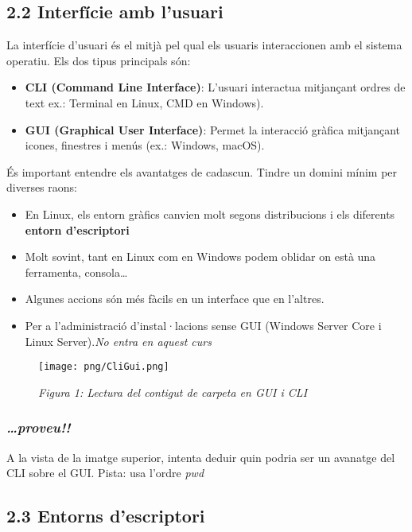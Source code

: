 \documentclass[
  a4paper,
]{article}
\providecommand{\tightlist}{%
  \setlength{\itemsep}{0pt}\setlength{\parskip}{0pt}}
\begin{document}
\subsection{2.2 Interfície amb
l'usuari}\label{interfuxedcie-amb-lusuari}

La interfície d'usuari és el mitjà pel qual els usuaris interaccionen
amb el sistema operatiu. Els dos tipus principals són:

\begin{itemize}
\item
  \textbf{CLI (Command Line Interface)}: L'usuari interactua mitjançant
  ordres de text ex.: Terminal en Linux, CMD en Windows).
\item
  \textbf{GUI (Graphical User Interface)}: Permet la interacció gràfica
  mitjançant icones, finestres i menús (ex.: Windows, macOS).
\end{itemize}

És important entendre els avantatges de cadascun. Tindre un domini mínim
per diverses raons:

\begin{itemize}
\tightlist
\item
  En Linux, els entorn gràfics canvien molt segons distribucions i els
  diferents \textbf{entorn d'escriptori}
\item
  Molt sovint, tant en Linux com en Windows podem oblidar on està una
  ferramenta, consola\ldots{}
\item
  Algunes accions són més fàcils en un interface que en l'altres.
\item
  Per a l'administració d'instal·lacions sense GUI (Windows Server Core
  i Linux Server).\emph{No entra en aquest curs}
\end{itemize}

\begin{figure}
\centering
\texttt{[image: png/CliGui.png]}
\caption{\emph{Figura 1: Lectura del contigut de carpeta en GUI i CLI}}
\end{figure}

\subsubsection{\texorpdfstring{\textbf{\emph{\ldots proveu!!}}}{\ldots proveu!!}}\label{proveu}

A la vista de la imatge superior, intenta deduir quin podria ser un
avanatge del CLI sobre el GUI. Pista: usa l'ordre \emph{pwd}

\subsection{2.3 Entorns d'escriptori}\label{entorns-descriptori}
\end{document}
